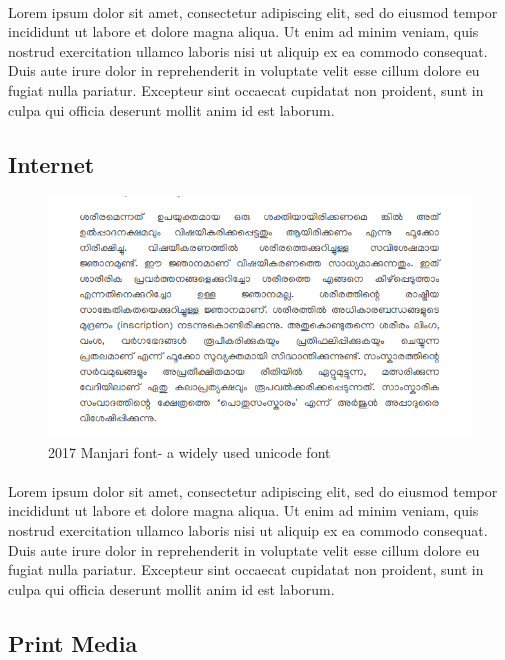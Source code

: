 \documentclass[10pt]{article}
\begin{document}
\paragraph{}

Lorem ipsum dolor sit amet, consectetur adipiscing elit, sed do eiusmod tempor incididunt ut labore et dolore magna aliqua. Ut enim ad minim veniam, quis nostrud exercitation ullamco laboris nisi ut aliquip ex ea commodo consequat. Duis aute irure dolor in reprehenderit in voluptate velit esse cillum dolore eu fugiat nulla pariatur. Excepteur sint occaecat cupidatat non proident, sunt in culpa qui officia deserunt mollit anim id est laborum.

\subsection{Internet}
\begin{figure}
  \centering
   \includegraphics[width=1.0\textwidth]{images/Manjari-Body-Text.png}
     \caption{2017 Manjari font- a widely used unicode font}
\end{figure}

\paragraph{}

Lorem ipsum dolor sit amet, consectetur adipiscing elit, sed do eiusmod tempor incididunt ut labore et dolore magna aliqua. Ut enim ad minim veniam, quis nostrud exercitation ullamco laboris nisi ut aliquip ex ea commodo consequat. Duis aute irure dolor in reprehenderit in voluptate velit esse cillum dolore eu fugiat nulla pariatur. Excepteur sint occaecat cupidatat non proident, sunt in culpa qui officia deserunt mollit anim id est laborum.
\subsection{Print Media}
\end{document}
